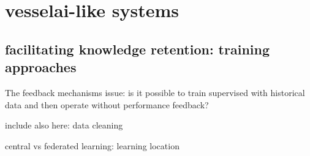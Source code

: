 






%
%



\chapter{vesselai-like systems}

\section{facilitating knowledge retention: training approaches}

The feedback mechanisms issue: is it possible to train supervised with historical data and then operate without performance feedback?

include also here: data cleaning

central vs federated learning: learning location

